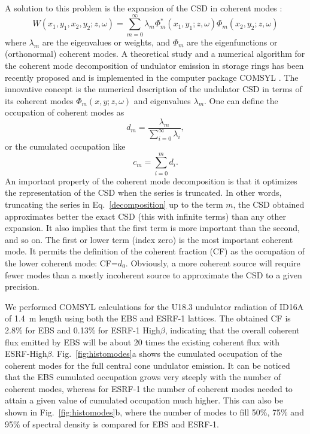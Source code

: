 \documentclass{iucr}              %
\begin{document}
A solution to this problem is the expansion of the CSD in coherent modes \cite{mandel_wolf}:  
\begin{equation}\label{decomposition}
 W(x_1,y_1,x_2,y_2;z,\omega) = \sum\limits_{m=0}^{\infty} \lambda_m \Phi_m^{*}(x_1,y_1;z,\omega) \Phi_m(x_2,y_2;z,\omega)
 \end{equation}
where $\lambda_m$ are the eigenvalues or weights, and $\Phi_m$ are the eigenfunctions or (orthonormal) coherent modes. A theoretical study and a numerical algorithm for the coherent mode decomposition of undulator emission in storage rings has been recently proposed  \cite{GlassThesis,GlassEPL} and is implemented in the computer package COMSYL \cite{codeCOMSYL}. The innovative concept is the numerical description of the undulator CSD in terms of its coherent modes $\Phi_m(x,y;z,\omega)$ and eigenvalues $\lambda_m $. One can define the occupation of coherent modes as
\begin{equation}
 d_m = \frac{\lambda_m}{\sum\limits_{i=0}^{\infty} \lambda_i},
\end{equation}
or the cumulated occupation like
\begin{equation}
 c_m = \sum\limits_{i=0}^{m} d_i.
\end{equation}
An important property of the coherent mode decomposition is that it optimizes the representation of the CSD when the series is truncated. In other words, truncating the series in Eq.~\ref{decomposition} up to the term $m$, the CSD obtained approximates better the exact CSD (this with infinite terms) than any other expansion. It also implies that the first term is more important than the second, and so on. The first or lower term (index zero) is the most important coherent mode. It permits the definition of the coherent fraction (CF) as the occupation of the lower coherent mode: CF=$d_0$. Obviously, a more coherent source will require fewer modes than a mostly incoherent source to approximate the CSD to a given precision.

We performed COMSYL calculations for the U18.3 undulator radiation of ID16A of 1.4~m length using both the EBS and ESRF-1 lattices. The obtained CF is 2.8\% for EBS and 0.13\% for ESRF-1 High$\beta$, indicating that the overall coherent flux emitted by EBS will be about 20 times the existing coherent flux with ESRF-High$\beta$. Fig.~\ref{fig:histomodes}a shows the cumulated occupation of the coherent modes for the full central cone undulator emission. It can be noticed that the EBS cumulated occupation grows very steeply with the number of coherent modes, whereas for ESRF-1 the number of coherent modes needed to attain a given value of cumulated occupation much higher. This can also be shown in Fig.~\ref{fig:histomodes}b, where the number of modes to fill 50\%, 75\% and 95\% of spectral density is compared for EBS and ESRF-1.   
\end{document}
